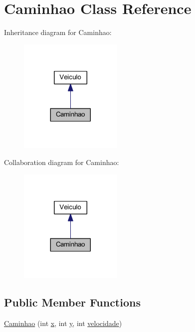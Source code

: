 \hypertarget{class_caminhao}{}\section{Caminhao Class Reference}
\label{class_caminhao}


Inheritance diagram for Caminhao\+:
\nopagebreak
\begin{figure}[H]
\begin{center}
\leavevmode
\includegraphics[width=140pt]{class_caminhao__inherit__graph}
\end{center}
\end{figure}


Collaboration diagram for Caminhao\+:
\nopagebreak
\begin{figure}[H]
\begin{center}
\leavevmode
\includegraphics[width=140pt]{class_caminhao__coll__graph}
\end{center}
\end{figure}
\subsection*{Public Member Functions}
\begin{DoxyCompactItemize}
\item 
\mbox{\hyperlink{class_caminhao_af84806c020691e90179569546094dc5a}{Caminhao}} (int \mbox{\hyperlink{class_veiculo_a069917a284297fe5b385258b2afd9ad6}{x}}, int \mbox{\hyperlink{class_veiculo_af25046404db7c2786c0d9e468bb1fb64}{y}}, int \mbox{\hyperlink{class_veiculo_a2edf5e3132b1c2504c441dc095dc7e0e}{velocidade}})
\end{DoxyCompactItemize}
